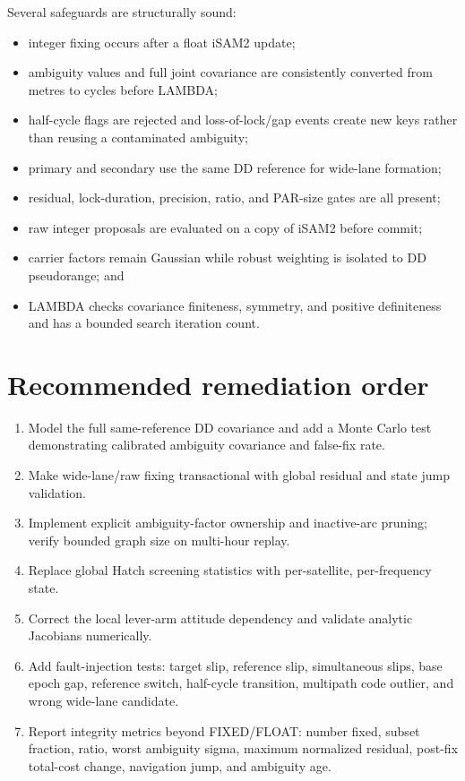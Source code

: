 \documentclass[11pt,a4paper]{article}
\begin{document}
Several safeguards are structurally sound:
\begin{itemize}
  \item integer fixing occurs after a float iSAM2 update;
  \item ambiguity values and full joint covariance are consistently converted
        from metres to cycles before LAMBDA;
  \item half-cycle flags are rejected and loss-of-lock/gap events create new
        keys rather than reusing a contaminated ambiguity;
  \item primary and secondary use the same DD reference for wide-lane formation;
  \item residual, lock-duration, precision, ratio, and PAR-size gates are all
        present;
  \item raw integer proposals are evaluated on a copy of iSAM2 before commit;
  \item carrier factors remain Gaussian while robust weighting is isolated to
        DD pseudorange; and
  \item LAMBDA checks covariance finiteness, symmetry, and positive definiteness
        and has a bounded search iteration count.
\end{itemize}

\section{Recommended remediation order}

\begin{enumerate}
  \item Model the full same-reference DD covariance and add a Monte Carlo test
        demonstrating calibrated ambiguity covariance and false-fix rate.
  \item Make wide-lane/raw fixing transactional with global residual and state
        jump validation.
  \item Implement explicit ambiguity-factor ownership and inactive-arc pruning;
        verify bounded graph size on multi-hour replay.
  \item Replace global Hatch screening statistics with per-satellite,
        per-frequency state.
  \item Correct the local lever-arm attitude dependency and validate analytic
        Jacobians numerically.
  \item Add fault-injection tests: target slip, reference slip, simultaneous
        slips, base epoch gap, reference switch, half-cycle transition,
        multipath code outlier, and wrong wide-lane candidate.
  \item Report integrity metrics beyond FIXED/FLOAT: number fixed, subset
        fraction, ratio, worst ambiguity sigma, maximum normalized residual,
        post-fix total-cost change, navigation jump, and ambiguity age.
\end{enumerate}
\end{document}
